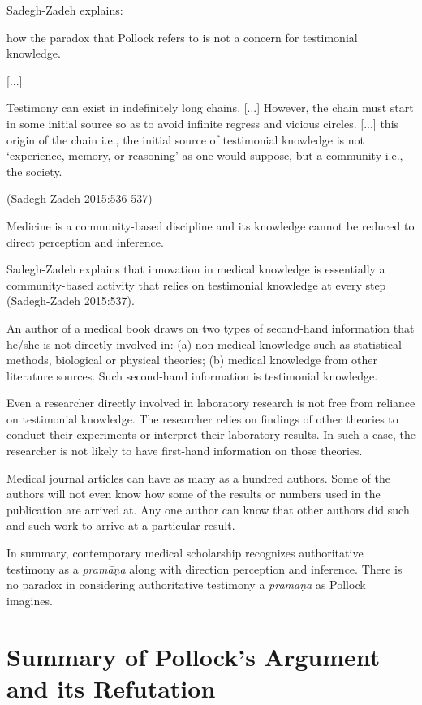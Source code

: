 Sadegh-Zadeh explains:
\begin{myquote}
how the paradox that Pollock refers to is not a concern for testimonial knowledge.  

[...]

Testimony can exist in indefinitely long chains. [...]  However, the chain must start in some initial source so as to avoid infinite regress and vicious circles.  [...] this origin of the chain i.e., the initial source of testimonial knowledge is not `experience, memory, or reasoning' as one would suppose, but a community i.e., the society.

\hfill (Sadegh-Zadeh 2015:536-537)
\end{myquote}

Medicine is a community-based discipline and its knowledge cannot be reduced to direct perception and inference. 

Sadegh-Zadeh explains that innovation in medical knowledge is essentially a community-based activity that relies on testimonial knowledge at every step (Sadegh-Zadeh 2015:537).

An author of a medical book draws on two types of second-hand information that he/she is not directly involved in: (a) non-medical knowledge such as statistical methods, biological or physical theories; (b) medical knowledge from other literature sources.  Such second-hand information is testimonial knowledge.

Even a researcher directly involved in laboratory research is not free from reliance on testimonial knowledge. The researcher relies on findings of other theories to conduct their experiments or interpret their laboratory results. In such a case, the researcher is not likely to have first-hand information on those theories.

Medical journal articles can have as many as a hundred authors. Some of the authors will not even know how some of the results or numbers used in the publication are arrived at. Any one author can know that other authors did such and such work to arrive at a particular result.

In summary, contemporary medical scholarship recognizes authoritative testimony as a {\sl pramāṇa} along with direction perception and inference. There is no paradox in considering authoritative testimony a {\sl pramāṇa} as Pollock imagines.

\section*{Summary of Pollock's Argument and its Refutation}

